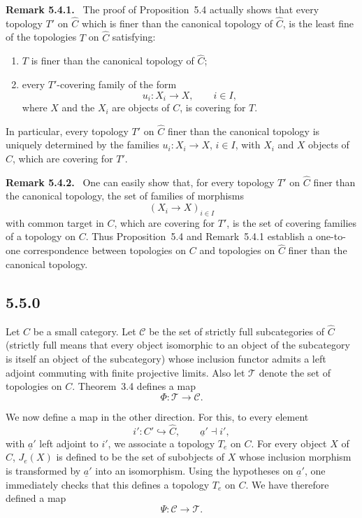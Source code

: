 \documentclass[11pt]{article}
\newenvironment{remarktext}[1]{\par\medskip\noindent\textbf{#1.}\ }{\par\medskip}
\begin{document}
\begin{remarktext}{Remark 5.4.1}
The proof of Proposition~5.4 actually shows that every topology \(T'\) on \(\widehat C\) which is finer than the canonical topology of \(\widehat C\), is the least fine of the topologies \(T\) on \(\widehat C\) satisfying:
\begin{enumerate}[label=\alph*)]
\item \(T\) is finer than the canonical topology of \(\widehat C\);
\item every \(T'\)-covering family of the form
\[
u_i:X_i\to X,\qquad i\in I,
\]
where \(X\) and the \(X_i\) are objects of \(C\), is covering for \(T\).
\end{enumerate}
In particular, every topology \(T'\) on \(\widehat C\) finer than the canonical topology is uniquely determined by the families \(u_i:X_i\to X\), \(i\in I\), with \(X_i\) and \(X\) objects of \(C\), which are covering for \(T'\).
\end{remarktext}

\begin{remarktext}{Remark 5.4.2}
One can easily show that, for every topology \(T'\) on \(\widehat C\) finer than the canonical topology, the set of families of morphisms
\[
(X_i\to X)_{i\in I}
\]
with common target in \(C\), which are covering for \(T'\), is the set of covering families of a topology on \(C\). Thus Proposition~5.4 and Remark~5.4.1 establish a one-to-one correspondence between topologies on \(C\) and topologies on \(\widehat C\) finer than the canonical topology.
\end{remarktext}

\subsection*{5.5.0}
Let \(C\) be a small category. Let \(\mathcal C\) be the set of strictly full subcategories of \(\widehat C\) (strictly full means that every object isomorphic to an object of the subcategory is itself an object of the subcategory) whose inclusion functor admits a left adjoint commuting with finite projective limits. Also let \(\mathcal T\) denote the set of topologies on \(C\). Theorem~3.4 defines a map
\[
\Phi:\mathcal T\longrightarrow \mathcal C.
\]

We now define a map in the other direction. For this, to every element
\[
i':C'\hookrightarrow \widehat C,\qquad \underline a'\dashv i',
\]
with \(\underline a'\) left adjoint to \(i'\), we associate a topology \(T_e\) on \(C\). For every object \(X\) of \(C\), \(J_e(X)\) is defined to be the set of subobjects of \(X\) whose inclusion morphism is transformed by \(\underline a'\) into an isomorphism. Using the hypotheses on \(\underline a'\), one immediately checks that this defines a topology \(T_e\) on \(C\). We have therefore defined a map
\[
\Psi:\mathcal C\longrightarrow \mathcal T.
\]
\end{document}
